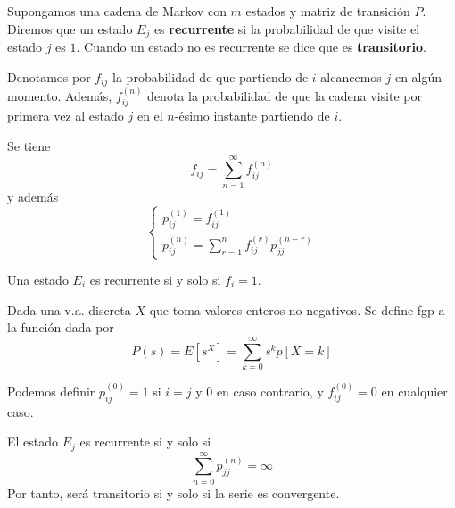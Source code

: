 \documentclass[PREyA.tex]{subfiles}
\begin{document}
\begin{defi}
Supongamos una cadena de Markov con $m$ estados y matriz de transición $P$. Diremos que un estado $E_j$ es \textbf{recurrente} si la probabilidad de que visite el estado $j$ es $1$. Cuando un estado no es recurrente se dice que es \textbf{transitorio}. 
\end{defi}
\begin{defi}
Denotamos por $f_{ij}$ la probabilidad de que partiendo de $i$ alcancemos $j$ en algún momento. Además, $f_{ij}^{(n)}$ denota la probabilidad de que la cadena visite por primera vez al estado $j$ en el $n$-ésimo instante partiendo de $i$. 
\end{defi}
\begin{prop}
Se tiene
$$
f_{ij} = \sum_{n=1}^\infty f_{ij}^{(n)}
$$
y además
$$
\begin{cases}
p_{ij}^{(1)} = f_{ij}^{(1)} \\
p_{ij}^{(n)} = \sum_{r=1}^{n}f_{ij}^{(r)}p_{jj}^{(n-r)}
\end{cases}
$$
\end{prop}
\begin{prop}
Una estado $E_i$ es recurrente si y solo si $f_i = 1$.
\end{prop}
\begin{defi}
Dada una v.a. discreta $X$ que toma valores enteros no negativos. Se define fgp a la función dada por
$$
P(s) = E[s^X] = \sum_{k=0}^\infty {s^k}p[X=k]
$$
\end{defi}
\begin{nota}
Podemos definir $p_{ij}^{(0)} = 1$ si $i=j$ y $0$ en caso contrario, y $f^{(0)}_{ij}=0$ en cualquier caso.
\end{nota}
\begin{theorem}
El estado $E_j$ es recurrente si y solo si
$$
\sum_{n = 0}^\infty p_{jj}^{(n)} = \infty
$$
Por tanto, será transitorio si y solo si la serie es convergente.
\end{theorem}
\end{document}
